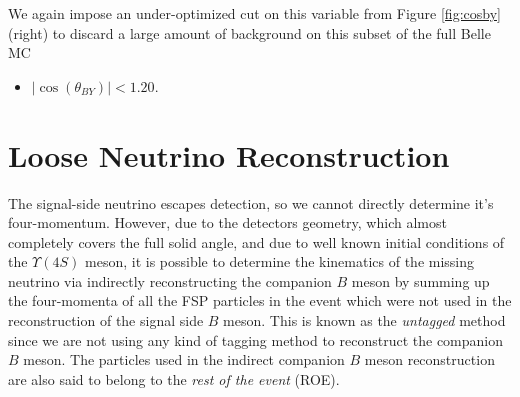 We again impose an under-optimized cut on this variable from Figure \ref{fig:cosby} (right) to discard a large amount of background on this subset of the full Belle MC
\begin{itemize}
	\item $\vert \cos \left(\theta_{BY}\right) \vert < 1.20$.
\end{itemize}

\section{Loose Neutrino Reconstruction}\label{sec:loose-neutrino-reconstruction}

%


The signal-side neutrino escapes detection, so we cannot directly determine it's four-momentum. However, due to the detectors geometry, which almost completely covers the full solid angle, and due to well known initial conditions of the $\Upsilon(4S)$ meson, it is possible to determine the kinematics of the missing neutrino via indirectly reconstructing the companion $B$ meson by summing up the four-momenta of all the FSP particles in the event which were not used in the reconstruction of the signal side $B$ meson. This is known as the \textit{untagged} method since we are not using any kind of tagging method to reconstruct the companion $B$ meson. The particles used in the indirect companion $B$ meson reconstruction are also said to belong to the \textit{rest of the event} (ROE).

